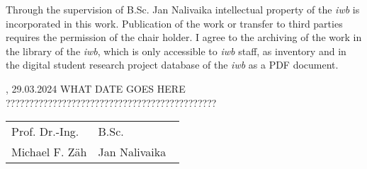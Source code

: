 Through the supervision of B.Sc. Jan Nalivaika intellectual property of the \textit{iwb} is incorporated in this work. Publication of the work or transfer to third parties requires the permission of the chair holder. I agree to the archiving of the work in the library of the \textit{iwb}, which is only accessible to \textit{iwb} staff, as inventory and in the digital student research project database of the \textit{iwb} as a PDF document.
\vfill

\IWBaddressCityChair, 29.03.2024 WHAT DATE GOES HERE ?????????????????????????????????????????????
\vspace{2.5cm}\\
\begin{tabular}{p{0.5\linewidth}p{0.5\linewidth} }
	Prof. Dr.-Ing.		& B.Sc.\\
Michael F. Zäh  	& Jan Nalivaika
\end{tabular}

